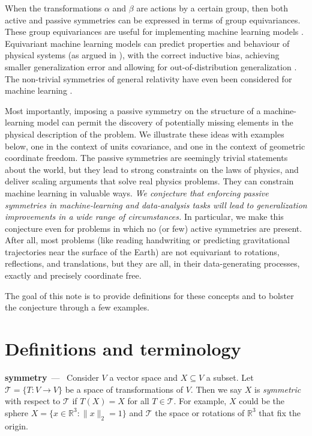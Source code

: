\documentclass{article}
\renewcommand{\paragraph}[1]{\par\textbf{#1}~---~}
\begin{document}
When the transformations $\alpha$ and $\beta$ are actions by a certain group, then both active and passive symmetries can be expressed in terms of group equivariances. These group equivariances are useful for implementing machine learning models \cite{foo}. Equivariant machine learning models can predict properties and behaviour of physical systems (as argued in \cite{cheng2019covariance}), with the correct inductive bias, achieving smaller generalization error \cite{bietti2021sample, elesedy2021provably, elesedy2021kernel, mei2021learning} and allowing for out-of-distribution generalization \cite{villar2022dimensionless}. 
The non-trivial symmetries of general relativity have even been considered for machine learning \cite{weiler}.

Most importantly, imposing a passive symmetry on the structure of a machine-learning model can permit the discovery of potentially missing elements in the physical description of the problem. We illustrate these ideas with examples below, one in the context of units covariance, and one in the context of geometric coordinate freedom.
The passive symmetries are seemingly trivial statements about the world, but they lead to strong constraints on the laws of physics, and deliver scaling arguments that solve real physics problems.
They can constrain machine learning in valuable ways.
\emph{We conjecture that enforcing passive symmetries in machine-learning and data-analysis tasks will lead to generalization improvements in a wide range of circumstances.}
In particular, we make this conjecture even for problems in which no (or few) active symmetries are present.
After all, most problems (like reading handwriting or predicting gravitational trajectories near the surface of the Earth) are not equivariant to rotations, reflections, and translations, but they are all, in their data-generating processes, exactly and precisely coordinate free.

The goal of this note is to provide definitions for these concepts and to bolster the conjecture through a few examples.

\section{Definitions and terminology}

\paragraph{symmetry} Consider $V$ a vector space and $X\subseteq V$ a subset. Let $\mathcal T= \{ T:V\to V \}$ be a space of transformations of $V$. Then we say $X$ is \emph{symmetric} with respect to $\mathcal T$ if $T(X)=X$ for all $T\in \mathcal T$. For example, $X$ could be the sphere $X=\{x\in \mathbb R^3: \|x\|_2=1\}$ and $\mathcal T$ the space or rotations of $\mathbb R^3$ that fix the origin.
\end{document}
